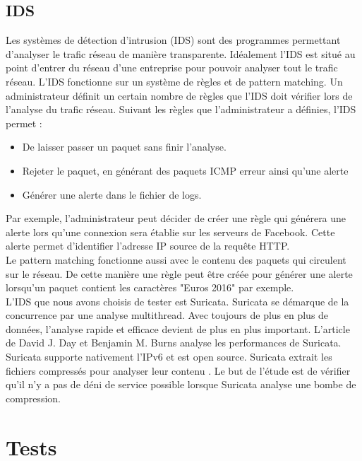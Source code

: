 \documentclass[smallextended]{svjour3}       %
\begin{document}
\subsection{IDS}
\label{2.3ids}
Les systèmes de détection d'intrusion (IDS) sont des programmes permettant d'analyser le trafic réseau de manière transparente. Idéalement l'IDS est situé au point d'entrer du réseau d'une entreprise pour pouvoir analyser tout le trafic réseau. L'IDS fonctionne sur un système de règles et de pattern matching. Un administrateur définit un certain nombre de règles que l'IDS doit vérifier lors de l'analyse du trafic réseau. Suivant les règles que l’administrateur a définies, l'IDS permet :
\begin{itemize}
\item De laisser passer un paquet sans finir l'analyse.
\item Rejeter le paquet, en générant des paquets ICMP erreur ainsi qu'une alerte
\item Générer une alerte dans le fichier de logs.
\end{itemize} 
Par exemple, l'administrateur peut décider de créer une règle  qui générera une alerte lors qu'une connexion sera établie sur les serveurs de Facebook. Cette alerte permet d'identifier l'adresse IP source de la requête HTTP.\\
Le pattern matching fonctionne aussi avec le contenu des paquets qui circulent sur le réseau. De cette manière une règle peut être créée pour générer une alerte lorsqu'un paquet contient les caractères "Euros 2016" par exemple.\\
L'IDS que nous avons choisis de tester est Suricata. Suricata se démarque de la concurrence par une analyse multithread. Avec toujours de plus en plus de données, l'analyse rapide et efficace devient de plus en plus important. L'article de David J. Day et Benjamin M. Burns \cite{PerformanceAnalysis}  analyse les performances de Suricata. Suricata supporte nativement l'IPv6 et est open source. Suricata extrait les fichiers compressés pour analyser leur contenu \cite{SuricataExtraction}. Le but de l’étude est de vérifier qu'il n'y a pas de déni de service possible lorsque Suricata analyse une bombe de compression.


\section{Tests}
\label{3.Tests}
\end{document}
